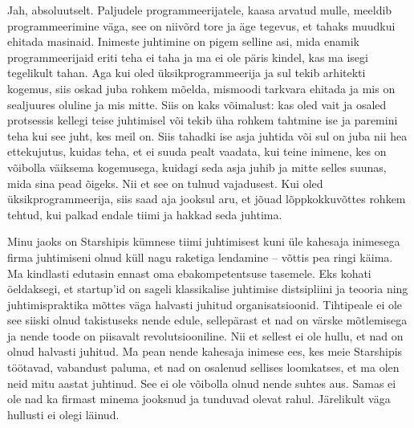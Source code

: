 
Jah, absoluutselt. Paljudele programmeerijatele, 
kaasa arvatud mulle, meeldib programmeerimine väga, see on niivõrd 
tore ja äge tegevus, et tahaks  
muudkui ehitada masinaid. Inimeste juhtimine on pigem selline asi, mida 
enamik programmeerijaid eriti teha ei taha ja ma ei ole päris kindel, kas ma 
isegi tegelikult tahan. Aga kui 
oled üksikprogrammeerija ja sul tekib arhitekti kogemus, siis 
oskad juba rohkem mõelda, mismoodi tarkvara ehitada ja mis 
on sealjuures oluline ja mis mitte. Siis on kaks võimalust: 
kas oled vait ja osaled protsessis kellegi teise juhtimisel või tekib üha 
rohkem tahtmine ise ja paremini 
teha kui see juht, kes meil on. Siis tahadki ise asja juhtida või sul on juba 
nii 
hea ettekujutus, kuidas teha, et ei suuda pealt vaadata, kui 
teine inimene, kes on võibolla väiksema kogemusega,  
kuidagi seda asja juhib ja mitte selles suunas, mida sina pead õigeks. Nii et 
see on tulnud vajadusest. Kui 
oled üksikprogrammeerija, siis saad aja jooksul aru, et jõuad
lõppkokkuvõttes rohkem tehtud, kui palkad 
endale tiimi ja hakkad seda juhtima. 

Minu jaoks on Starshipis kümnese 
tiimi juhtimisest kuni üle kahesaja inimesega firma juhtimiseni olnud küll nagu 
raketiga lendamine – võttis pea ringi käima. Ma kindlasti 
edutasin ennast oma ebakompetentsuse tasemele. Eks kohati öeldaksegi, et 
startup'id on sageli klassikalise juhtimise 
distsipliini ja teooria ning juhtimispraktika mõttes väga halvasti juhitud 
organisatsioonid. Tihtipeale ei ole see siiski olnud takistuseks nende edule, 
sellepärast et nad on värske mõtlemisega ja nende toode on 
piisavalt revolutsiooniline. Nii et sellest ei ole 
hullu, et nad on olnud halvasti juhitud. Ma pean nende kahesaja 
inimese ees, kes meie Starshipis töötavad, vabandust paluma, et nad on osalenud 
sellises loomkatses, 
et ma olen neid mitu aastat juhtinud. See ei ole võibolla olnud nende 
suhtes aus. Samas ei ole nad ka firmast minema jooksnud 
ja tunduvad olevat rahul. Järelikult väga hullusti ei olegi läinud.
